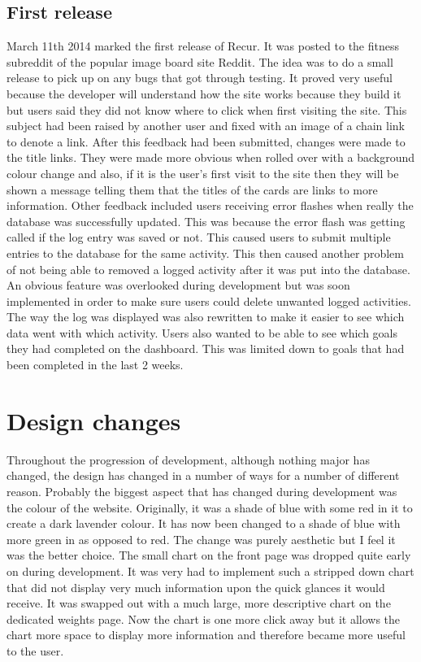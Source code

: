 \subsection{First release}
March 11th 2014 marked the first release of Recur. It was posted to the fitness subreddit of the popular image board site Reddit\citep{reddit:2005}. The idea was to do a small release to pick up on any bugs that got through testing. It proved very useful because the developer will understand how the site works because they build it but users said they did not know where to click when first visiting the site. This subject had been raised by another user and fixed with an image of a chain link to denote a link. After this feedback had been submitted, changes were made to the title links. They were made more obvious when rolled over with a background colour change and also, if it is the user's first visit to the site then they will be shown a message telling them that the titles of the cards are links to more information. Other feedback included users receiving error flashes when really the database was successfully updated. This was because the error flash was getting called if the log entry was saved or not. This caused users to submit multiple entries to the database for the same activity. This then caused another problem of not being able to removed a logged activity after it was put into the database. An obvious feature was overlooked during development but was soon implemented in order to make sure users could delete unwanted logged activities. The way the log was displayed was also rewritten to make it easier to see which data went with which activity. Users also wanted to be able to see which goals they had completed on the dashboard. This was limited down to goals that had been completed in the last 2 weeks.

\section{Design changes}
Throughout the progression of development, although nothing major has changed, the design has changed in a number of ways for a number of different reason. Probably the biggest aspect that has changed during development was the colour of the website. Originally, it was a shade of blue with some red in it to create a dark lavender colour. It has now been changed to a shade of blue with more green in as opposed to red. The change was purely aesthetic but I feel it was the better choice. The small chart on the front page was dropped quite early on during development. It was very had to implement such a stripped down chart that did not display very much information upon the quick glances it would receive. It was swapped out with a much large, more descriptive chart on the dedicated weights page. Now the chart is one more click away but it allows the chart more space to display more information and therefore became more useful to the user.


